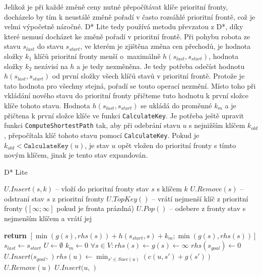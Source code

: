 Jelikož je při každé změně ceny nutné přepočítávat klíče prioritní fronty, docházelo by tím k neustálé změně pořadí v často rozsáhlé prioritní frontě, což je velmi výpočetně náročné. D* Lite tedy používá metodu převzatou z D*, díky které nemusí docházet ke změně pořadí v prioritní frontě. Při pohybu robota ze stavu $s_{last}$ do stavu $s_{start}$, ve kterém je zjištěna změna cen přechodů, je hodnota složky $k_1$ klíčů prioritní fronty menší o~maximálně $h(s_{last},s_{start})$, hodnota složky $k_2$ nezávisí na $h$ a je tedy nezměněna. Je tedy potřeba odečíst hodnotu $h(s_{last},s_{start})$ od první složky všech klíčů stavů v prioritní frontě. Protože je tato hodnota pro všechny stejná, pořadí se touto operací nezmění. Místo toho při vkládání nového stavu do prioritní fronty přičteme tuto hodnotu k první složce klíče tohoto stavu. Hodnota $h(s_{last},s_{start})$ se ukládá do proměnné $k_m$ a je přičtena k první složce klíče ve funkci \texttt{CalculateKey}. Je potřeba ještě upravit funkci \texttt{ComputeShortestPath} tak, aby při odebrání stavu $u$ s nejnižším klíčem $k_{old}$, přepočítala klíč tohoto stavu pomocí \texttt{CalculateKey}. Pokud je $k_{old}<\texttt{CalculateKey}(u)$, je stav $u$ opět vložen do prioritní fronty s tímto novým klíčem, jinak je tento stav expandován.

\begin{algorithm}[H]
	\caption{D* Lite}
	\label{alg:DStarLiteP1}
	\begin{algorithmic}[1]
		\Statex %
		$U.Insert(s,k)$ -- vloží do prioritní fronty stav $s$ s klíčem $k$
		\Statex %
		$U.Remove(s)$ -- odstraní stav $s$ z prioritní fronty
		\Statex %
		$U.TopKey()$ -- vrátí nejmenší klíč z prioritní fronty ($[\infty;\infty]$ pokud je fronta prázdná)
		\Statex %
		$U.Pop()$ -- odebere z fronty stav s nejmenším klíčem a vrátí jej\strut
		\Statex
		\State \textbf{return} $[\min(g(s),rhs(s))+h(s_{start},s)+k_m;\min(g(s),rhs(s))]$
		\EndFunction
		\Statex
		\State $s_{last}\gets s_{start}$
		\State $U\gets \emptyset$
		\State $k_m\gets 0$
		\State $\forall s\in V: rhs(s)\gets g(s)\gets \infty$
		\State $rhs(s_{goal})\gets 0$
		\State $U.Insert(s_{goal},$ $)$
		\EndFunction
		\Statex
		\State $rhs(u)\gets \min_{s'\in Succ(u)}(c(u,s')+g(s'))$
		\EndIf
		\State $U.Remove(u)$
		\EndIf
		\State $U.Insert(u,$ $)$
		\EndIf
		\EndFunction
	\end{algorithmic}
\end{algorithm}

